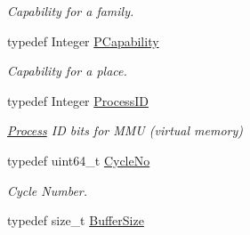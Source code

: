 \begin{DoxyCompactItemize}
\begin{DoxyCompactList}\small\item\em Capability for a family. \end{DoxyCompactList}\item 
typedef Integer \hyperlink{namespace_simulator_a6b57ad19b5768f31acd2aaf9fe53bcd9}{P\+Capability}
\begin{DoxyCompactList}\small\item\em Capability for a place. \end{DoxyCompactList}\item 
typedef Integer \hyperlink{namespace_simulator_a62ef2d2c77bd54a16c39881f6266875e}{Process\+I\+D}
\begin{DoxyCompactList}\small\item\em \hyperlink{class_simulator_1_1_process}{Process} I\+D bits for M\+M\+U (virtual memory) \end{DoxyCompactList}\item 
typedef uint64\+\_\+t \hyperlink{namespace_simulator_a928f1e2101eba21bb0fe409e8c9ce573}{Cycle\+No}
\begin{DoxyCompactList}\small\item\em Cycle Number. \end{DoxyCompactList}\item 
typedef size\+\_\+t \hyperlink{namespace_simulator_a5ca279f926485be2d0554e41275a3305}{Buffer\+Size}
\end{DoxyCompactItemize}
